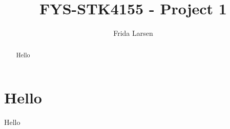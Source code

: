 \documentclass[notitlepage, reprint, nofootinbib]{revtex4-1}
\begin{document}
\title{FYS-STK4155 - Project 1}
\author{Frida Larsen}

\begin{abstract}
Hello 
\end{abstract}

\maketitle




\section{Hello}
Hello
\end{document}
